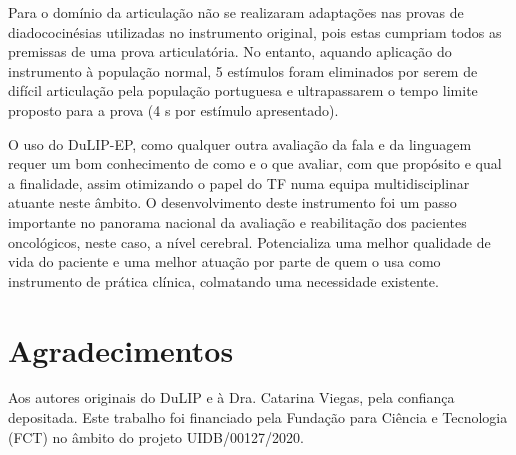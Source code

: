 \documentclass[output=paper,colorlinks,citecolor=brown,booklanguage=portuguese]{langscibook}
\begin{document}
Para o domínio da articulação não se realizaram adaptações nas provas de diadococinésias utilizadas no instrumento original, pois estas cumpriam todos as premissas de uma prova articulatória. No entanto, aquando aplicação do instrumento à população normal, 5 estímulos foram eliminados por serem de difícil articulação pela população portuguesa e ultrapassarem o tempo limite proposto para a prova (4 s por estímulo apresentado).

O uso do DuLIP-EP, como qualquer outra avaliação da fala e da linguagem requer um bom conhecimento de como e o que avaliar, com que propósito e qual a finalidade, assim otimizando o papel do TF numa equipa multidisciplinar atuante neste âmbito. O desenvolvimento deste instrumento foi um passo importante no panorama nacional da avaliação e reabilitação dos pacientes oncológicos, neste caso, a nível cerebral. Potencializa uma melhor qualidade de vida do paciente e uma melhor atuação por parte de quem o usa como instrumento de prática clínica, colmatando uma necessidade existente.

\section{Agradecimentos}
Aos autores originais do DuLIP e à Dra. Catarina Viegas, pela confiança depositada. Este trabalho foi financiado pela Fundação para Ciência e Tecnologia (FCT) no âmbito do projeto UIDB/00127/2020.


{\sloppy\printbibliography[heading=subbibliography,notkeyword=this]}
\end{document}
